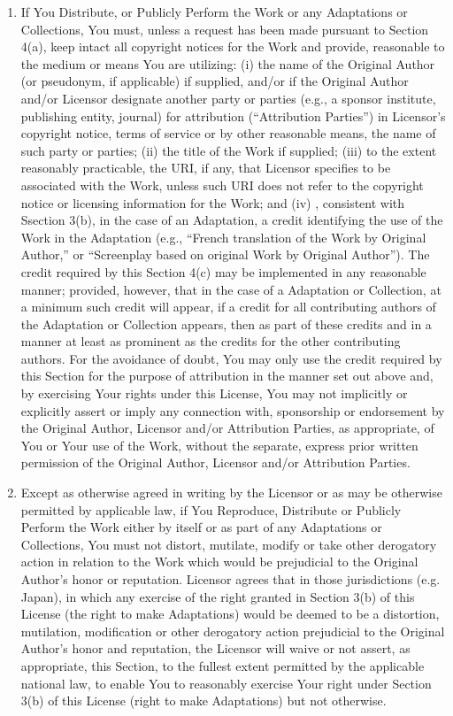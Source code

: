 \begin{enumerate}
\item If You Distribute, or Publicly Perform the Work or
  any Adaptations or Collections, You must, unless a
  request has been made pursuant to Section 4(a), keep
  intact all copyright notices for the Work and provide,
  reasonable to the medium or means You are utilizing: (i)
  the name of the Original Author (or pseudonym, if
  applicable) if supplied, and/or if the Original Author
  and/or Licensor designate another party or parties (e.g.,
  a sponsor institute, publishing entity, journal) for
  attribution (``Attribution Parties'') in Licensor's
  copyright notice, terms of service or by other reasonable
  means, the name of such party or parties; (ii) the title
  of the Work if supplied; (iii) to the extent reasonably
  practicable, the URI, if any, that Licensor specifies to
  be associated with the Work, unless such URI does not
  refer to the copyright notice or licensing information
  for the Work; and (iv) , consistent with Ssection 3(b),
  in the case of an Adaptation, a credit identifying the
  use of the Work in the Adaptation (e.g., ``French
  translation of the Work by Original Author,'' or
  ``Screenplay based on original Work by Original Author'').
  The credit required by this Section 4(c) may be
  implemented in any reasonable manner; provided, however,
  that in the case of a Adaptation or Collection, at a
  minimum such credit will appear, if a credit for all
  contributing authors of the Adaptation or Collection
  appears, then as part of these credits and in a manner at
  least as prominent as the credits for the other
  contributing authors. For the avoidance of doubt, You may
  only use the credit required by this Section for the
  purpose of attribution in the manner set out above and,
  by exercising Your rights under this License, You may not
  implicitly or explicitly assert or imply any connection
  with, sponsorship or endorsement by the Original Author,
  Licensor and/or Attribution Parties, as appropriate, of
  You or Your use of the Work, without the separate,
  express prior written permission of the Original Author,
  Licensor and/or Attribution Parties.

\item Except as otherwise agreed in writing by the Licensor
  or as may be otherwise permitted by applicable law, if
  You Reproduce, Distribute or Publicly Perform the Work
  either by itself or as part of any Adaptations or
  Collections, You must not distort, mutilate, modify or
  take other derogatory action in relation to the Work
  which would be prejudicial to the Original Author's honor
  or reputation. Licensor agrees that in those
  jurisdictions (e.g. Japan), in which any exercise of the
  right granted in Section 3(b) of this License (the right
  to make Adaptations) would be deemed to be a distortion,
  mutilation, modification or other derogatory action
  prejudicial to the Original Author's honor and
  reputation, the Licensor will waive or not assert, as
  appropriate, this Section, to the fullest extent
  permitted by the applicable national law, to enable You
  to reasonably exercise Your right under Section 3(b) of
  this License (right to make Adaptations) but not
  otherwise.


\end{enumerate}
